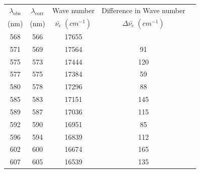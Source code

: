 \begin{table}[H]
    \centering
    \begin{tabular}{|c|c|c|c|c|}
        \hline
        $\lambda_\text{obs}$& $\lambda_\text{corr}$ & Wave number & Difference in Wave number\\
        (nm) & (nm) & $\bar{\nu_e}\;(cm^{-1})$ & $\Delta\bar{\nu_e}\;(cm^{-1})$ \\ \hline
        568                         & 566                     & 17655                                  &                                              \\ \hline
        571                         & 569                     & 17564                                  & 91                                           \\ \hline
        575                         & 573                     & 17444                                  & 120                                          \\ \hline
        577                         & 575                     & 17384                                  & 59                                           \\ \hline
        580                         & 578                     & 17296                                  & 88                                           \\ \hline
        585                         & 583                     & 17151                                  & 145                                          \\ \hline
        589                         & 587                     & 17036                                  & 115                                          \\ \hline
        592                         & 590                     & 16951                                  & 85                                           \\ \hline
        596                         & 594                     & 16839                                  & 112                                          \\ \hline
        602                         & 600                     & 16674                                  & 165                                          \\ \hline
        607                         & 605                     & 16539                                  & 135                                          \\ \hline

\end{tabular}
\end{table}
